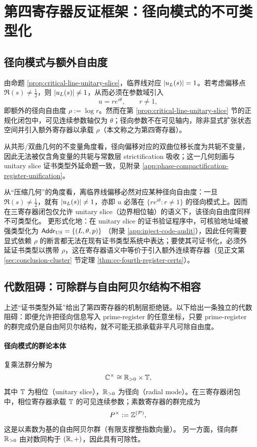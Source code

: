 \section{第四寄存器反证框架：径向模式的不可类型化}\label{sec:fourth-register}

\subsection{径向模式与额外自由度}
由命题 \ref{prop:critical-line-unitary-slice}，临界线对应 $\left\lvert u_L(s)\right\rvert=1$。若考虑偏移点 $\Re(s)\neq\tfrac12$，则 $\left\lvert u_L(s)\right\rvert\neq 1$，从而必须在参数域引入
$$
u=re^{i\theta},\qquad r\neq 1,
$$
即额外的径向自由度 $\rho:=\log r$。然而在第 \ref{prop:critical-line-unitary-slice} 节的正规化闭包中，可见连续参数轴仅为 $\theta$；径向参数不在可见轴内，除非显式扩张状态空间并引入额外寄存器以承载 $\rho$（本文称之为第四寄存器）。
\par
从共形/双曲几何的不变量角度看，径向偏移对应的双曲位移长度为共轭不变量，因此无法被仅含角变量的共轭与常数层 strictification 吸收；这一几何刻画与 unitary slice 证书类型外延命题一致，见附录 \ref{app:phase-compactification-register-unification}。
\par
从“压缩几何”的角度看，离临界线偏移必然对应某种径向自由度：一旦 $\Re(s)\neq\tfrac12$，就有 $\left\lvert u_L(s)\right\rvert\neq 1$，亦即 $u$ 必落在 $\{re^{i\theta}:r\neq 1\}$ 的径向模式上。因而在三寄存器闭包仅允许 unitary slice（边界相位轴）的语义下，该径向自由度同样不可类型化。
更形式化地：在 unitary slice 的证书验证程序中，可核验地址域被强类型化为
$
\mathsf{Addr}_{\mathrm{US}}=\{(L,\theta,p)\}
$
（附录 \ref{app:inject-code-audit}），因此任何需要显式依赖 $\rho$ 的断言都无法在现有证书类型系统中表达；要使其可证书化，必须外延证书类型以携带 $\rho$，这在寄存器语义中等价于引入额外连续寄存器（见正文第 \ref{sec:conclusion-cluster} 节定理 \ref{thm:cc-fourth-register-certs}）。

\subsection{代数阻碍：可除群与自由阿贝尔结构不相容}\label{subsec:fourth-register-divisible}
上述“证书类型外延”给出了第四寄存器的机制层拒绝链。以下给出一条独立的代数阻碍：即便允许把径向信息写入 prime-register 的任意坐标，只要 prime-register 的群完成仍是自由阿贝尔结构，就不可能无损承载非平凡可除自由度。

\paragraph{径向模式的群论本体}
复乘法群分解为
$$
\mathbb{C}^\times\cong \mathbb{R}_{>0}\times \mathbb{T},
$$
其中 $\mathbb{T}$ 为相位（unitary slice），$\mathbb{R}_{>0}$ 为径向（radial mode）。在三寄存器闭包中，相位寄存器承载 $\mathbb{T}$ 的可见连续参数；素数寄存器的群完成为
$$
P^\times:=\mathbb{Z}^{(\mathcal{P})},
$$
这是以素数为基的自由阿贝尔群（有限支撑整指数向量）。
另一方面，径向群 $\mathbb{R}_{>0}$ 由对数同构于 $(\mathbb{R},+)$，因此具有可除性。

